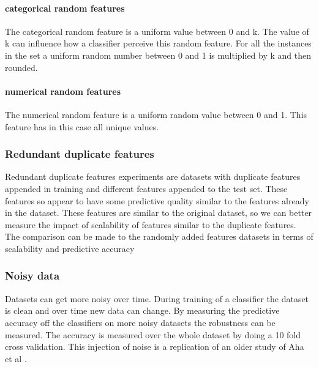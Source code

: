 \documentclass[a4paper,10pt]{article}
\begin{document}
 
\paragraph{categorical random features \newline}
The categorical random feature is a uniform value between 0 and k. The value of k can influence how a classifier perceive this random feature. For all the instances in the set a uniform random number between 0 and 1 is multiplied by k and then rounded. 
\paragraph{numerical random features \newline}
The numerical random feature is a uniform random value between 0 and 1. This feature has in this case all unique values.

\subsubsection{Redundant duplicate features}
Redundant duplicate features experiments are datasets with duplicate features appended in training and different features appended to the test set. These features so appear to have some predictive quality similar to the features already in the dataset. These features are similar to the original dataset, so we can better measure the impact of scalability of features similar to the duplicate features. The comparison can be made to the randomly added features datasets in terms of scalability and predictive accuracy 


\subsubsection{Noisy data}
Datasets can get more noisy over time. During training of a classifier the dataset is clean and over time new data can change. By measuring the predictive accuracy off the classifiers on more noisy datasets the robustness can be measured. The accuracy is measured over the whole dataset by doing a 10 fold cross validation. This injection of noise is a replication of an older study of Aha et al \cite{Noise}.
\end{document}
